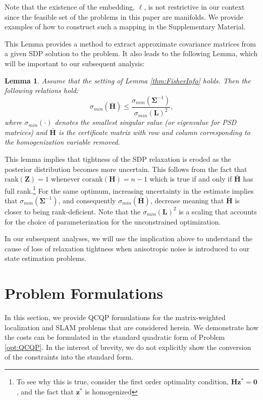 \documentclass[lettersize,journal]{IEEEtran}
\newtheorem{lemma}[theorem]{Lemma}
\begin{document}
{Note that the existence of the embedding, $\bm{\ell}$, is not restrictive in our context since the feasible set of the problems in this paper are manifolds.  We provide examples of how to construct such a mapping in the Supplementary Material.

This Lemma provides a method to extract approximate covariance matrices from a given SDP solution to the problem. It also leads to the following Lemma, which will be important to our subsequent analysis:
\begin{lemma}\label{thm:eig_bounds}
	Assume that the setting of Lemma \ref{thm:FisherInfo} holds. Then the following relations hold:
	\begin{equation}
		\sigma_{min}(\bar{\bm{H}})  \leq \frac{\sigma_{min}(\bm{\Sigma}^{-1})}{\sigma_{min}(\bm{L})^2}, 
	\end{equation}
	where $\sigma_{min}(\cdot)$ denotes the smallest singular value (or eigenvalue for PSD matrices) and $\bar{\bm{H}}$ is the certificate matrix with row and column corresponding to the homogenization variable removed.
\end{lemma}

This lemma implies that tightness of the SDP relaxation is eroded as the posterior distribution becomes more uncertain. This follows from the fact that $\mbox{rank}(\bm{Z})=1$ whenever $\mbox{corank}(\bm{H})=n-1$ which is true if and only if $\bar{\bm{H}}$ has full rank.\footnote{To see why this is true, consider the first order optimality condition, $\bm{H}\bm{z}^*=\bm{0}$, and the fact that $\bm{z}^*$ is homogenized} For the same optimum, increasing uncertainty in the estimate implies that $\sigma_{min}(\bm{\Sigma}^{-1})$, and consequently $\sigma_{min}(\bar{\bm{H}})$, decrease meaning that $\bar{\bm{H}}$ is closer to being rank-deficient. Note that the $\sigma_{min}(\bm{L})^2$ is a scaling that accounts for the choice of parameterization for the unconstrained optimization.

In our subsequent analyses, we will use the implication above to understand the cause of loss of relaxation tightness when anisotropic noise is introduced to our state estimation problems. 
}

\section{Problem Formulations}\label{sec:Formulations}

In this section, we provide QCQP formulations for the matrix-weighted localization and SLAM problems that are considered herein. We demonstrate how the costs can be formulated in the standard quadratic form of Problem \eqref{opt:QCQP}. In the interest of brevity, we do not explicitly show the conversion of the constraints into the standard form.
\end{document}
